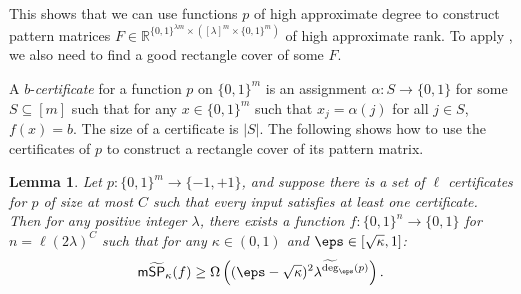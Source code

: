 \documentclass[11pt]{article}
\numberwithin{equation}{section}
\newtheorem{lemma}[theorem]{Lemma}
\theoremstyle{definition}
\theoremstyle{plain}
\newcommand{\R}{\mathbb R}
\begin{document}
This shows that we can use functions $p$ of high approximate degree to construct pattern matrices $F\in\R^{\{0,1\}^{\lambda m}\times ([\lambda]^m\times\{0,1\}^m)}$ of high approximate rank. To apply , we also need to find a good rectangle cover of some $F$. 

A $b$-\emph{certificate} for a function $p$ on $\{0,1\}^m$ is an assignment $\alpha:S\rightarrow\{0,1\}$ for some $S\subseteq [m]$ such that for any $x\in \{0,1\}^m$ such that $x_j=\alpha(j)$ for all $j\in S$, $f(x)=b$. The size of a certificate is $|S|$. The following shows how to use the certificates of $p$ to construct a rectangle cover of its pattern matrix.


\begin{lemma}\label{lem:certificate}
Let $p:\{0,1\}^m\rightarrow\{-1,+1\}$, and suppose there is a set of $\ell$ certificates for $p$ of size at most $C$ such that every input satisfies at least one certificate. Then for any positive integer $\lambda$, there exists a function $f:\{0,1\}^n\rightarrow\{0,1\}$ for $n=\ell(2\lambda)^C$ such that for any $\kappa\in (0,1)$ and $\eps\in[\sqrt{\kappa},1]$:
$$\mathsf{m}\widetilde{\mathsf{SP}}_{\kappa}(f)\geq \Omega\left( (\eps-\sqrt{\kappa})^2 \lambda^{\widetilde{\deg}_\eps(p)}\right).$$
\end{lemma}
\end{document}
